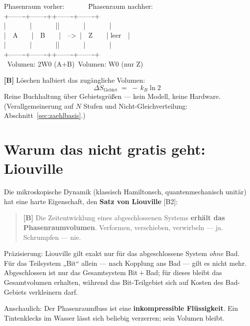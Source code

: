 \begin{center}
\begin{minipage}{0.75\textwidth}
\ttfamily\small
\begin{tabbing}
Phasenraum vorher:\ \ \ \ \ \ \ \=Phasenraum nachher:\\[0.3em]
+-------+-------+\>+-------+-------+\\
|\ \ \ \ \ \ \ |\ \ \ \ \ \ \ |\>|\ \ \ \ \ \ \ |\ \ \ \ \ \ \ |\\
|\ \ A\ \ \ \ |\ \ B\ \ \ \ |\ \ -->\ \>|\ \ Z\ \ \ \ | leer\ \ |\\
|\ \ \ \ \ \ \ |\ \ \ \ \ \ \ |\>|\ \ \ \ \ \ \ |\ \ \ \ \ \ \ |\\
+-------+-------+\>+-------+-------+\\
\ Volumen: 2W0 (A+B)\>\ Volumen: W0 (nur Z)
\end{tabbing}
\end{minipage}
\end{center}

\textbf{[B]} Löschen halbiert das zugängliche Volumen:
\[
  \Delta S_{\text{Gebiet}} \;=\; -\,k_B \ln 2
\]
Reine Buchhaltung über Gebietsgrößen --- kein Modell, keine Hardware.
(Verallgemeinerung auf $N$ Stufen und Nicht-Gleichverteilung:
Abschnitt~\ref{sec:zaehlbasis}.)

\section{Warum das nicht gratis geht: Liouville}
\label{sec:liouville}

Die mikroskopische Dynamik (klassisch Hamiltonsch, quantenmechanisch unitär) hat
eine harte Eigenschaft, den \textbf{Satz von Liouville} [B2]:

\begin{quote}
\textbf{[B]} Die Zeitentwicklung eines abgeschlossenen Systems \textbf{erhält das
Phasenraumvolumen}. Verformen, verschieben, verwirbeln --- ja. Schrumpfen --- nie.
\end{quote}

Präzisierung: Liouville gilt exakt nur für das abgeschlossene System \emph{ohne}
Bad. Für das Teilsystem „Bit“ allein --- nach Kopplung ans Bad --- gilt es nicht
mehr. Abgeschlossen ist nur das Gesamtsystem Bit${}+{}$Bad; für dieses bleibt das
Gesamtvolumen erhalten, während das Bit-Teilgebiet sich auf Kosten des Bad-Gebiets
verkleinern darf.

Anschaulich: Der Phasenraumfluss ist eine \textbf{inkompressible Flüssigkeit}. Ein
Tintenklecks im Wasser lässt sich beliebig verzerren; sein Volumen bleibt.

